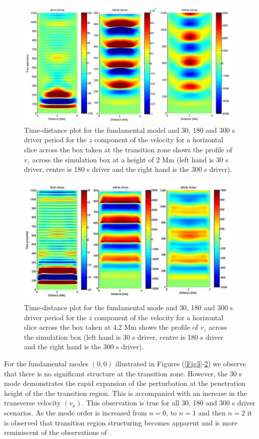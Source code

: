 \documentclass[preprint,authoryear,12pt]{elsarticle}
\begin{document}
\begin{figure}[h]
\includegraphics[scale=1]{imrescale/fig4_dt_30_180_300_0_horiz_2Mm.jpg}
\caption{Time-distance plot for the fundamental model and 30, 180 and 300 s driver period for the $z$ component of the velocity for a horizontal slice across the box  taken at the transition zone shows  the profile of $v_{z}$ across the simulation box at a height of 2 Mm (left hand is 30 s driver, centre is 180 s driver and the right hand is the 300 s driver). }
\label{Fig5}
\end{figure}
\begin{figure}[h]
\includegraphics[scale=1]{imrescale/fig5_dt_30_180_300_0_horiz_4p2Mm.jpg}
\caption{Time-distance plot for the fundamental mode and 30, 180 and 300 s driver period for the $z$ component of the velocity for a horizontal slice across the box  taken at 4.2 Mm shows  the profile of $v_{z}$ across the simulation box (left hand is 30 s driver, centre is 180 s driver and the right hand is the 300 s driver). }
\label{Fig6}
\end{figure}
For the fundamental modes $(0, 0)$  illustrated in Figures (\ref{Fig3}-\ref{Fig6})  we observe that there is no significant structure at the transition zone. However, the 30 s mode demonstrates the rapid expansion of the perturbation at the penetration height of the the transition region. This is accompanied with an increase in the transverse velocity $(v_x)$. This observation is true for all 30, 180 and 300 s driver scenarios. As the mode order is increased from $n=0$, to $n=1$ and then $n=2$ it is observed that transition region structuring becomes apparent and is more reminiscent of the observations of \citet{Malins2007A}.
\end{document}
